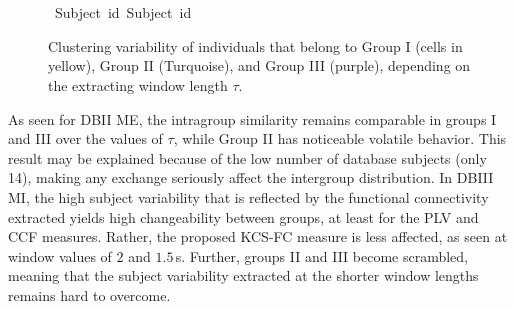 \begin{figure}[h!]
	{}\\
	{}
	{}\\
	\hbox{\hspace{2.1cm} \footnotesize{Subject id}\hspace{5cm} \footnotesize{Subject id}}
	\caption{Clustering variability of individuals that belong to Group I (cells in yellow), {Group II (Turquoise), and Group III (purple)}, depending on the extracting window length $\tau$.} \label{Fig:clust}	
\end{figure} 

{As seen for DBII ME, the intragroup similarity remains comparable in groups I and III over the values of $\tau$, while Group II has noticeable volatile behavior}. This result may be explained because of the low number of database subjects (only 14), making any exchange seriously affect the intergroup distribution. In DBIII MI, the high subject variability that is reflected by the functional connectivity extracted yields high changeability between groups, at least for the PLV and CCF measures. Rather, the proposed KCS-FC measure is less affected, as seen at window values of $2$ and $1.5$\,{s}. Further, groups II and III become scrambled, meaning that the subject variability extracted at the shorter window lengths remains hard to overcome. 

